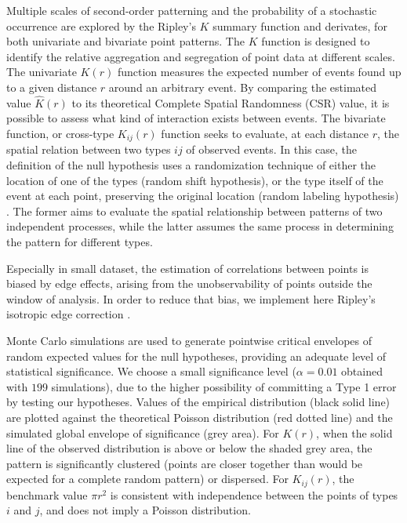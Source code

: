\documentclass[review,authoryear]{elsarticle} %
\begin{document}
Multiple scales of second-order patterning and the probability of a stochastic occurrence are explored by the Ripley's $K$ summary function \citep{Ripley1976,Ripley1977} and derivates, for both univariate and bivariate point patterns. The $K$ function is designed to identify the relative aggregation and segregation of point data at different scales. The univariate $K(r)$ function measures the expected number of events found up to a given distance $r$ around an arbitrary event. By comparing the estimated value $\hat{K}(r)$ to its theoretical Complete Spatial Randomness (CSR) value, it is possible to assess what kind of interaction exists between events. The bivariate function, or cross-type $K_{ij}(r)$ function seeks to evaluate, at each distance $r$, the spatial relation between two types $ij$ of observed events. In this case, the definition of the null hypothesis uses a randomization technique of either the location of one of the types (random shift hypothesis), or the type itself of the event at each point, preserving the original location (random labeling hypothesis) \citep{Goreaud2003}. The former aims to evaluate the spatial relationship between patterns of two independent processes, while the latter assumes the same process in determining the pattern for different types.

Especially in small dataset, the estimation of correlations between points is biased by edge effects, arising from the unobservability of points outside the window of analysis. In order to reduce that bias, we implement here Ripley's isotropic edge correction \citep{Ripley1988,Ohser1983}.

Monte Carlo simulations \citep{Robert2004} are used to generate pointwise critical envelopes of random expected values for the null hypotheses, providing an adequate level of statistical significance. We choose a small significance level ($\alpha=0.01$ obtained with $199$ simulations), due to the higher possibility of committing a Type 1 error by testing our hypotheses. Values of the empirical distribution (black solid line) are plotted against the theoretical Poisson distribution (red dotted line) and the simulated global envelope of significance (grey area). For $K(r)$, when the solid line of the observed distribution is above or below the shaded grey area, the pattern is significantly clustered (points are closer together than would be expected for a complete random pattern) or dispersed. For $K_{ij}(r)$, the benchmark value $\pi r^2$ is consistent with independence between the points of types $i$ and $j$, and does not imply a Poisson distribution.
\end{document}

